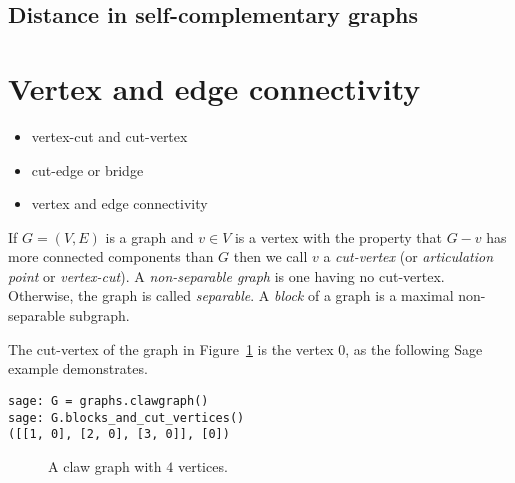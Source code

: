 
\subsection{Distance in self-complementary graphs}



\section{Vertex and edge connectivity}

\begin{itemize}
\item vertex-cut and cut-vertex

\item cut-edge or bridge

\item vertex and edge connectivity
\end{itemize}

If $G=(V,E)$ is a graph and $v\in V$ is a vertex with the property
that $G-v$ has more connected components than $G$ then
we call $v$ a {\it cut-vertex} (or {\it articulation point} or {\it vertex-cut}).
A {\it non-separable graph} is one having no cut-vertex.
Otherwise, the graph is called {\it separable}.
A {\it block} of a graph is a maximal non-separable subgraph.

\begin{example}
{\rm
The cut-vertex of the graph in Figure~\ref{fig:distance_connectivity:claw_graph}
is the vertex $0$, as the following Sage example
demonstrates.

\begin{lstlisting}
sage: G = graphs.clawgraph()
sage: G.blocks_and_cut_vertices()
([[1, 0], [2, 0], [3, 0]], [0])
\end{lstlisting}

\begin{figure}[!htbp]
\centering

\caption{A claw graph with $4$ vertices.}
\label{fig:distance_connectivity:claw_graph}
\end{figure}
}
\end{example}

